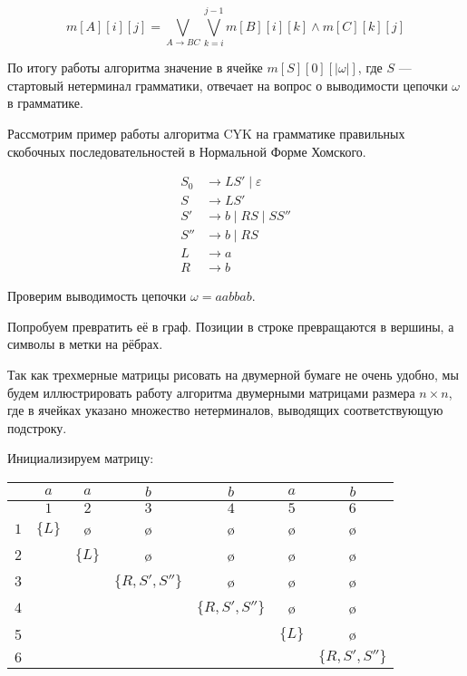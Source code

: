 \[ m[A][i][j] = \bigvee_{A \to B C}^{}{\bigvee_{k=i}^{j-1}{m[B][i][k] \wedge m[C][k][j]}} \]

По итогу работы алгоритма значение в ячейке $m[S][0][|\omega|]$, где $S$ --- стартовый нетерминал грамматики, отвечает на вопрос о выводимости цепочки $\omega$ в грамматике. 

\begin{example}
  Рассмотрим пример работы алгоритма CYK на грамматике правильных скобочных последовательностей в Нормальной Форме Хомского. 

  \begin{align*}
    S_0 &\to L S' \mid \varepsilon \\ 
    S   &\to L S' \\ 
    S'  &\to b \mid R S \mid S S'' \\ 
    S'' &\to b \mid R S \\
    L   &\to a \\ 
    R   &\to b
  \end{align*}
  
Проверим выводимость цепочки $\omega = a a b b a b$.

Попробуем превратить её в граф. Позиции в строке превращаются в вершины, а символы в метки на рёбрах.

Так как трехмерные матрицы рисовать на двумерной бумаге не очень удобно, мы будем иллюстрировать работу алгоритма двумерными матрицами размера $n \times n$, где в ячейках указано множество нетерминалов, выводящих соответствующую подстроку. 

Инициализируем матрицу: 

\begin{center}
  \begin{tabular}{c||cc|cc|cc}
    & $a$ & $a$ & $b$ & $b$ & $a$ & $b$ \\ \hline
    & $1$ & $2$ & $3$ & $4$ & $5$ & $6$ \\ \hline \hline
  $1$ & $\{L\}$ & \o & \o & \o & \o & \o \\ 
  $2$ &   & $\{L\}$ & \o & \o & \o & \o \\ \hline
  $3$ &   &   & $\{R, S', S''\}$ & \o & \o & \o \\ 
  $4$ &   &   &   & $\{R, S', S''\}$ & \o & \o \\ \hline
  5 &   &   &   &   & $\{L\}$ & \o \\ 
  $6$ &   &   &   &   &   & $\{R, S', S''\}$
  \end{tabular}
\end{center}


\end{example}
